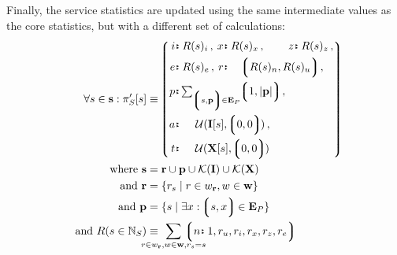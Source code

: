 Finally, the service statistics are updated using the same intermediate values as the core statistics, but with a different set of calculations:
\begin{align}
  \forall s \in \mathbf{s} : \pi'_S[s] &\equiv \tup{
    \begin{alignedat}{5}
      \is{i&}{R(s)_i}\,,\;
      \is{&x&}{R(s)_x}\,,\;
      \is{&z&}{R(s)_z}\,,\\
      \is{e&}{R(s)_e}\,,\;
      \is{&r&}{\span\span\tup{R(s)_n, R(s)_u}}\,,\;\\
      \is{p&}{\span\span \textstyle \sum_{\tup{s, \mathbf{p}} \in \mathbf{E}_P} \tup{1, |\mathbf{p}|}}\,,\;\\
      \is{a&}{\span\span \subifnone(\mathbf{I}[s], \tup{0, 0})}\,,\; \ \ \\
      \is{t&}{\span\span \subifnone(\mathbf{X}[s], \tup{0, 0})} \quad\\
    \end{alignedat}
  }\!\!\!\!\\
  \where \mathbf{s} &= \mathbf{r} \cup \mathbf{p} \cup \keys{\mathbf{I}} \cup \keys{\mathbf{X}}\\
  \also \mathbf{r} &= \{r_s \mid r \in w_\mathbf{r}, w \in \mathbf{w} \}\\
  \also \mathbf{p} &= \{s \mid \exists x: \tup{s, x} \in \mathbf{E}_P \}\\
  \also R(s \in \N_S) &\equiv \!\!\!\!\!\!\!\!\!\!\!
    \sum_{r \in w_\mathbf{r}, w \in \mathbf{w}, r_s = s}\!\!\!\!\!\!\!\!\!\!\!
    \tup{\is{n}{1}, r_u, r_i, r_x, r_z, r_e}
\end{align}

